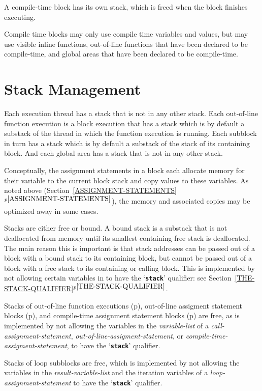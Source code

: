 \documentclass[12pt]{article}
\newcommand{\TT}[1]{{\tt \bfseries #1}}
\newcommand{\itemref}[1]{\ref{#1}$^{p\pageref{#1}}$}
\newcommand{\pagref}[1]{p\pageref{#1}}
\begin{document}
A compile-time block has its own stack, which is freed when the
block finishes executing.

Compile time blocks may only use compile time variables and values,
but may use visible inline functions, out-of-line functions
that have been declared to be compile-time, and global areas
that have been declared to be compile-time.

\section{Stack Management}
\label{STACK-MANAGEMENT}

Each execution thread has a stack that is not in any other
stack.  Each out-of-line function
execution is a block execution that has a stack which is
by default a substack of the thread in which the function
execution is running.  Each subblock in turn has a stack
which is by default a substack of the stack of its containing block.
And each global area has a stack that is not in any other stack.

Conceptually, the assignment statements in a block each allocate memory for
their variable to the current block stack and copy values to these
variables.  As noted above (Section~\itemref{ASSIGNMENT-STATEMENTS}),
the memory and associated copies may be
optimized away in some cases.

Stacks are either free or bound.\label{FREE-STACK}
A bound stack is a substack that is
not deallocated from memory until its smallest containing free stack is
deallocated.  The main reason this is important is that stack addresses
can be passed out of a block with a bound stack to its containing block,
but cannot be passed out of a block with a free stack to its containing
or calling block.  This is implemented by not allowing certain
variables in to have the `\TT{stack}' qualifier: see
Section~\itemref{THE-STACK-QUALIFIER}.

Stacks of out-of-line function executions
(\pagref{OUT-OF-LINE-FUNCTIONS}),
out-of-line assigment statement blocks
(\pagref{OUT-OF-LINE-ASSIGNMENT-STATEMENTS}),
and
compile-time assignment statement blocks
(\pagref{COMPILE-TIME-ASSIGNMENT-STATEMENTS})
are free, as is implemented by
not allowing the variables in the {\em variable-list}
of a {\em call-assignment-statement},
{\em out-of-line-assigment-statement}, or
{\em compile-time-assigment-statement},
to have the `\TT{stack}' qualifier.

Stacks of loop subblocks are free,
which is implemented by not
allowing the variables in the {\em result-variable-list}
and the iteration variables
of a {\em loop-assignment-statement} to have the `\TT{stack}'
qualifier.
\end{document}
